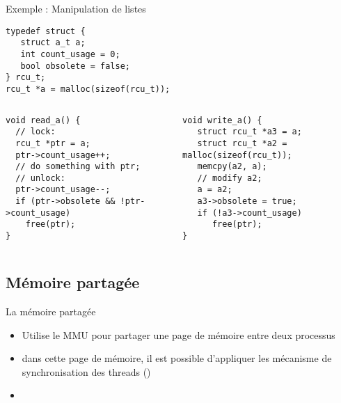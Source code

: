 \begin{frame}[fragile]{Exemple : Manipulation de listes} 
  \begin{center}
    \begin{lstlisting}[basicstyle=\ttfamily\scriptsize\color{colBasic},commentstyle=\scriptsize\itshape\color{colComments},numbers=none]
typedef struct {
   struct a_t a;
   int count_usage = 0;
   bool obsolete = false;
} rcu_t;
rcu_t *a = malloc(sizeof(rcu_t)); 
    \end{lstlisting}
  \end{center}
  \begin{columns}
    \begin{column}{5cm}
      \begin{lstlisting}[basicstyle=\ttfamily\scriptsize\color{colBasic},commentstyle=\scriptsize\itshape\color{colComments},numbers=none]
void read_a() {
  // lock:
  rcu_t *ptr = a;
  ptr->count_usage++;
  // do something with ptr;
  // unlock:
  ptr->count_usage--;
  if (ptr->obsolete && !ptr->count_usage)
    free(ptr);
}
      \end{lstlisting}
    \end{column}
    \begin{column}{5cm}
      \begin{lstlisting}[basicstyle=\ttfamily\scriptsize\color{colBasic},commentstyle=\scriptsize\itshape\color{colComments},numbers=none]
void write_a() { 
   struct rcu_t *a3 = a;
   struct rcu_t *a2 = malloc(sizeof(rcu_t));
   memcpy(a2, a);
   // modify a2;   
   a = a2;  
   a3->obsolete = true;
   if (!a3->count_usage)
      free(ptr);
}
      \end{lstlisting} 
    \end{column}
  \end{columns}
\end{frame} 

\subsection{Mémoire partagée}

\begin{frame}[fragile=singleslide]{La mémoire partagée}
  \begin{itemize} 
  \item Utilise  le MMU pour partager  une page de  mémoire entre deux
    processus
  \item dans  cette page de  mémoire, il est possible  d'appliquer les
    mécanisme        de       synchronisation        des       threads
    ()
  \item 
  \end{itemize} 
\end{frame} 

